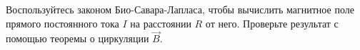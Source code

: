 \documentclass[__main__.tex]{subfiles}
\begin{document}
Воспользуйтесь законом Био-Савара-Лапласа, чтобы вычислить магнитное поле прямого постоянного тока $I$ на расстоянии $R$ от него. Проверьте результат с помощью теоремы о циркуляции $\vec{B}$.\\ 

\end{document}
